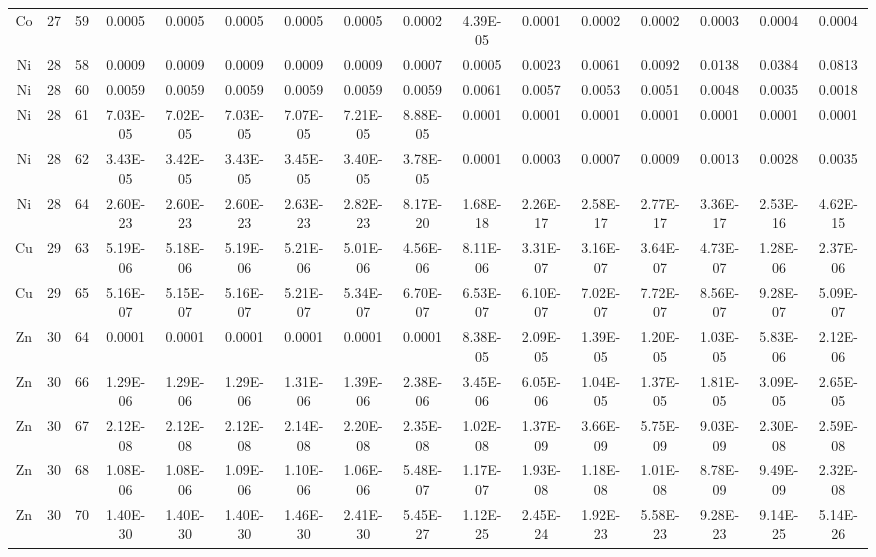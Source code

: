 {\begin{tabular}{|c|c|c|c|c|c|c|c|c|c|c|c|c|c|c|c|}
Co & 27 & 59  & 0.0005   & 0.0005   & 0.0005   & 0.0005   & 0.0005   & 0.0002   & 4.39E-05 & 0.0001   & 0.0002   & 0.0002   & 0.0003   & 0.0004   & 0.0004   \\
Ni & 28 & 58  & 0.0009   & 0.0009   & 0.0009   & 0.0009   & 0.0009   & 0.0007   & 0.0005   & 0.0023   & 0.0061   & 0.0092   & 0.0138   & 0.0384   & 0.0813   \\
Ni & 28 & 60  & 0.0059   & 0.0059   & 0.0059   & 0.0059   & 0.0059   & 0.0059   & 0.0061   & 0.0057   & 0.0053   & 0.0051   & 0.0048   & 0.0035   & 0.0018   \\
Ni & 28 & 61  & 7.03E-05 & 7.02E-05 & 7.03E-05 & 7.07E-05 & 7.21E-05 & 8.88E-05 & 0.0001   & 0.0001   & 0.0001   & 0.0001   & 0.0001   & 0.0001   & 0.0001   \\
Ni & 28 & 62  & 3.43E-05 & 3.42E-05 & 3.43E-05 & 3.45E-05 & 3.40E-05 & 3.78E-05 & 0.0001   & 0.0003   & 0.0007   & 0.0009   & 0.0013   & 0.0028   & 0.0035   \\
Ni & 28 & 64  & 2.60E-23 & 2.60E-23 & 2.60E-23 & 2.63E-23 & 2.82E-23 & 8.17E-20 & 1.68E-18 & 2.26E-17 & 2.58E-17 & 2.77E-17 & 3.36E-17 & 2.53E-16 & 4.62E-15 \\
Cu & 29 & 63  & 5.19E-06 & 5.18E-06 & 5.19E-06 & 5.21E-06 & 5.01E-06 & 4.56E-06 & 8.11E-06 & 3.31E-07 & 3.16E-07 & 3.64E-07 & 4.73E-07 & 1.28E-06 & 2.37E-06 \\
Cu & 29 & 65  & 5.16E-07 & 5.15E-07 & 5.16E-07 & 5.21E-07 & 5.34E-07 & 6.70E-07 & 6.53E-07 & 6.10E-07 & 7.02E-07 & 7.72E-07 & 8.56E-07 & 9.28E-07 & 5.09E-07 \\
Zn & 30 & 64  & 0.0001   & 0.0001   & 0.0001   & 0.0001   & 0.0001   & 0.0001   & 8.38E-05 & 2.09E-05 & 1.39E-05 & 1.20E-05 & 1.03E-05 & 5.83E-06 & 2.12E-06 \\
Zn & 30 & 66  & 1.29E-06 & 1.29E-06 & 1.29E-06 & 1.31E-06 & 1.39E-06 & 2.38E-06 & 3.45E-06 & 6.05E-06 & 1.04E-05 & 1.37E-05 & 1.81E-05 & 3.09E-05 & 2.65E-05 \\
Zn & 30 & 67  & 2.12E-08 & 2.12E-08 & 2.12E-08 & 2.14E-08 & 2.20E-08 & 2.35E-08 & 1.02E-08 & 1.37E-09 & 3.66E-09 & 5.75E-09 & 9.03E-09 & 2.30E-08 & 2.59E-08 \\
Zn & 30 & 68  & 1.08E-06 & 1.08E-06 & 1.09E-06 & 1.10E-06 & 1.06E-06 & 5.48E-07 & 1.17E-07 & 1.93E-08 & 1.18E-08 & 1.01E-08 & 8.78E-09 & 9.49E-09 & 2.32E-08 \\
Zn & 30 & 70  & 1.40E-30 & 1.40E-30 & 1.40E-30 & 1.46E-30 & 2.41E-30 & 5.45E-27 & 1.12E-25 & 2.45E-24 & 1.92E-23 & 5.58E-23 & 9.28E-23 & 9.14E-25 & 5.14E-26 \\

\end{tabular}}
